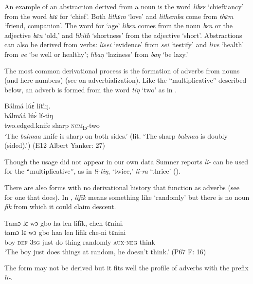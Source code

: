 An example of an abstraction derived from a noun is the word \textit{libɛɛ} ‘chieftiancy' from the word \textit{bɛɛ} for ‘chief'. Both \textit{lithɛm} ‘love' and \textit{lithemba} come from \textit{thɛm} ‘friend, companion'. The word for ‘age' \textit{libɛn} comes from the noun \textit{bɛn} or the adjective \textit{bɛn} ‘old,' and \textit{likith} ‘shortness' from the adjective ‘short'. Abstractions can also be derived from verbs: \textit{lisei} ‘evidence' from \textit{sei} ‘testify' and \textit{live} ‘health' from \textit{ve} ‘be well or healthy'; \textit{libaŋ} ‘laziness' from \textit{baŋ} ‘be lazy.'

The most common derivational process is the formation of adverbs from nouns (and here numbers) (see  on adverbialization). Like the “multiplicative” described below, an adverb is formed from the word \textit{tiŋ} ‘two' as in .

\ea%
    \label{ex:155}
    Bálmá lúɛ́ lítìŋ.\\
    \gll bálmáá        lúɛ́      lí-tìŋ\\
    two.edged.knife  sharp    \textsc{ncm}\textsubscript{lɔ}{}-two\\
    \glt ‘The \textit{balmaa} knife is sharp on both sides.' (lit. ‘The sharp \textit{balmaa} is doubly (sided).') (E12 Albert Yanker: 27)
\z

Though the usage did not appear in our own data Sumner  reports \textit{li-} can be used for the “multiplicative”, as in \textit{li-tiŋ}, ‘twice,' \textit{li-ra} ‘thrice' (\citealt[34]{Sumner1921}).

There are also forms with no derivational history that function as adverbs (see   for one that does). In , \textit{lifĩk} means something like ‘randomly' but there is no noun \textit{fik} from which it could claim descent.

\ea%
    \label{ex:156}
    Tamɔ lɛ wɔ gbo ha len lifĩk, chen tɛnini.\\
    \gll tamɔ  lɛ    wɔ    gbo  haa  len    lifik      che-ni    tɛnini\\
    boy  \textsc{def}  \textsc{3sg}  just  do    thing    randomly  \textsc{aux-neg}  think\\
    \glt ‘The boy just does things at random, he doesn't think.' (P67 F: 16)
\z

The form may not be derived but it fits well the profile of adverbs with the prefix \textit{li-}.

